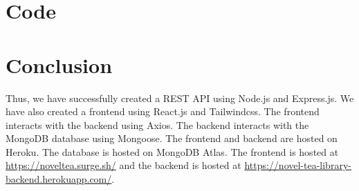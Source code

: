 \documentclass[11pt]{article}
\begin{document}
\section{Code}






\section{Conclusion}
Thus, we have successfully created a REST API using Node.js and Express.js. We have also created a frontend using React.js and Tailwindcss. The frontend interacts with the backend using Axios. The backend interacts with the MongoDB database using Mongoose. The frontend and backend are hosted on Heroku. The database is hosted on MongoDB Atlas. The frontend is hosted at \url{https://noveltea.surge.sh/} and the backend is hosted at \url{https://novel-tea-library-backend.herokuapp.com/}.

\clearpage
\end{document}
